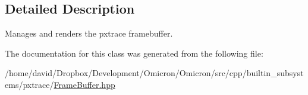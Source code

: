 \subsection{Detailed Description}
Manages and renders the pxtrace framebuffer. 

The documentation for this class was generated from the following file\+:\begin{DoxyCompactItemize}
\item 
/home/david/\+Dropbox/\+Development/\+Omicron/\+Omicron/src/cpp/builtin\+\_\+subsystems/pxtrace/\hyperlink{_frame_buffer_8hpp}{Frame\+Buffer.\+hpp}\end{DoxyCompactItemize}
